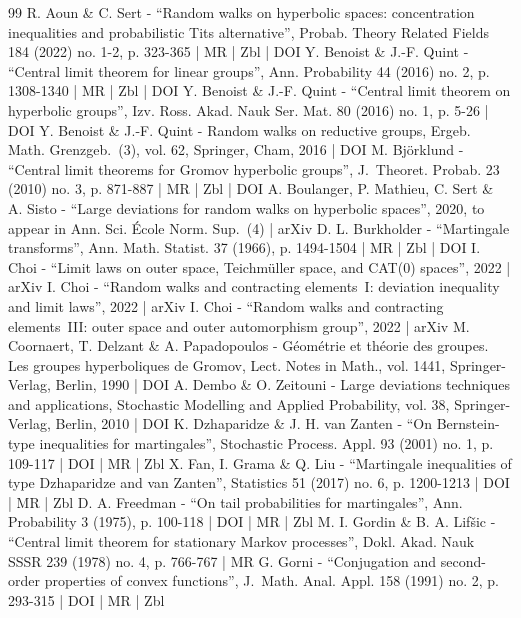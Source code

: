 \begin{thebibliography}{99}
R. Aoun \& C. Sert - “Random walks on hyperbolic spaces: concentration inequalities and probabilistic Tits alternative”, Probab. Theory Related Fields 184 (2022) no. 1-2, p. 323-365 | MR | Zbl | DOI
Y. Benoist \& J.-F. Quint - “Central limit theorem for linear groups”, Ann. Probability 44 (2016) no. 2, p. 1308-1340 | MR | Zbl | DOI
Y. Benoist \& J.-F. Quint - “Central limit theorem on hyperbolic groups”, Izv. Ross. Akad. Nauk Ser. Mat. 80 (2016) no. 1, p. 5-26 | DOI
Y. Benoist \& J.-F. Quint - Random walks on reductive groups, Ergeb. Math. Grenzgeb. (3), vol. 62, Springer, Cham, 2016 | DOI
M. Björklund - “Central limit theorems for Gromov hyperbolic groups”, J. Theoret. Probab. 23 (2010) no. 3, p. 871-887 | MR | Zbl | DOI
A. Boulanger, P. Mathieu, C. Sert \& A. Sisto - “Large deviations for random walks on hyperbolic spaces”, 2020, to appear in Ann. Sci. École Norm. Sup. (4) | arXiv
D. L. Burkholder - “Martingale transforms”, Ann. Math. Statist. 37 (1966), p. 1494-1504 | MR | Zbl | DOI
I. Choi - “Limit laws on outer space, Teichmüller space, and CAT(0) spaces”, 2022 | arXiv
I. Choi - “Random walks and contracting elements I: deviation inequality and limit laws”, 2022 | arXiv
I. Choi - “Random walks and contracting elements III: outer space and outer automorphism group”, 2022 | arXiv
M. Coornaert, T. Delzant \& A. Papadopoulos - Géométrie et théorie des groupes. Les groupes hyperboliques de Gromov, Lect. Notes in Math., vol. 1441, Springer-Verlag, Berlin, 1990 | DOI
A. Dembo \& O. Zeitouni - Large deviations techniques and applications, Stochastic Modelling and Applied Probability, vol. 38, Springer-Verlag, Berlin, 2010 | DOI
K. Dzhaparidze \& J. H. van Zanten - “On Bernstein-type inequalities for martingales”, Stochastic Process. Appl. 93 (2001) no. 1, p. 109-117 | DOI | MR | Zbl
X. Fan, I. Grama \& Q. Liu - “Martingale inequalities of type Dzhaparidze and van Zanten”, Statistics 51 (2017) no. 6, p. 1200-1213 | DOI | MR | Zbl
D. A. Freedman - “On tail probabilities for martingales”, Ann. Probability 3 (1975), p. 100-118 | DOI | MR | Zbl
M. I. Gordin \& B. A. Lifšic - “Central limit theorem for stationary Markov processes”, Dokl. Akad. Nauk SSSR 239 (1978) no. 4, p. 766-767 | MR
G. Gorni - “Conjugation and second-order properties of convex functions”, J. Math. Anal. Appl. 158 (1991) no. 2, p. 293-315 | DOI | MR | Zbl

\end{thebibliography}
